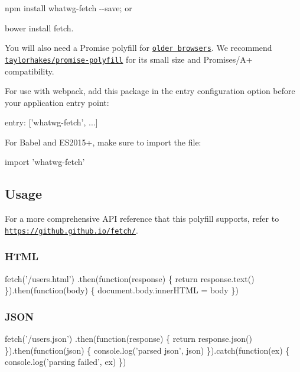 \begin{DoxyItemize}
\item {\ttfamily npm install whatwg-\/fetch -\/-\/save}; or
\item {\ttfamily bower install fetch}.
\end{DoxyItemize}

You will also need a Promise polyfill for \href{http://caniuse.com/#feat=promises}{\tt older browsers}. We recommend \href{https://github.com/taylorhakes/promise-polyfill}{\tt taylorhakes/promise-\/polyfill} for its small size and Promises/\+A+ compatibility.

For use with webpack, add this package in the {\ttfamily entry} configuration option before your application entry point\+:


\begin{DoxyCode}
entry: ['whatwg-fetch', ...]
\end{DoxyCode}


For Babel and E\+S2015+, make sure to import the file\+:


\begin{DoxyCode}
import 'whatwg-fetch'
\end{DoxyCode}


\subsection*{Usage}

For a more comprehensive A\+PI reference that this polyfill supports, refer to \href{https://github.github.io/fetch/}{\tt https\+://github.\+github.\+io/fetch/}.

\subsubsection*{H\+T\+ML}


\begin{DoxyCode}
fetch('/users.html')
  .then(function(response) \{
    return response.text()
  \}).then(function(body) \{
    document.body.innerHTML = body
  \})
\end{DoxyCode}


\subsubsection*{J\+S\+ON}


\begin{DoxyCode}
fetch('/users.json')
  .then(function(response) \{
    return response.json()
  \}).then(function(json) \{
    console.log('parsed json', json)
  \}).catch(function(ex) \{
    console.log('parsing failed', ex)
  \})
\end{DoxyCode}


